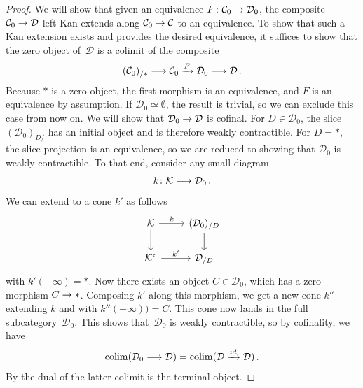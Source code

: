 \documentclass[10pt]{amsart}
\numberwithin{equation}{section}
\theoremstyle{definition}
\DeclareMathOperator*{\colim}{colim}
\newcommand{\cC}{\mathcal{C}}
\newcommand{\calD}{\mathcal{D}}
\newcommand{\cK}{\mathcal{K}}
\renewcommand{\to}{\mathchoice{\longrightarrow}{\rightarrow}{}{}}
\begin{document}
\begin{proof}
	We will show that given an equivalence $F\colon \cC_{0} \to \calD_{0}$, the composite $\cC_{0} \to \calD$ left Kan extends along $\cC_{0} \to \cC$ to an equivalence.
	To show that such a Kan extension exists and provides the desired equivalence,
	it suffices to show that the zero object of~$\calD$ is a colimit of the composite
	\begin{align*}
		(\cC_{0})_{/\ast} \to \cC_{0} \xrightarrow{F} \calD_{0} \to \calD \,.
	\end{align*}
	Because $\ast$ is a zero object, the first morphism is an equivalence, and $F$ is an equivalence by assumption.
	If $\calD_{0} \simeq \emptyset$, the result is trivial, so we can exclude this case from now on.
	We will show that $\calD_{0}\to \calD$ is cofinal. For $D\in \calD_{0}$, the slice $(\calD_{0})_{D/}$ has an initial object and is therefore weakly contractible.
	For $D=\ast$, the slice projection is an equivalence, so we are reduced to showing that $\calD_{0}$ is weakly contractible.
	To that end, consider any small diagram
	\begin{align*}
		k\colon \cK\to \calD_{0} \,.
	\end{align*}
	We can extend to a cone $k'$ as follows
	\begin{equation*}
		\begin{tikzcd}
			\cK \arrow[r, "k"] \arrow[d] & (\calD_{0})_{/D} \arrow[d] \\
			\cK^{\triangleleft} \arrow[r, "k'"] & \calD_{/D}
		\end{tikzcd}
	\end{equation*}
	with $k'(-\infty) = \ast$.
	Now there exists an object $C\in \calD_{0}$, which has a zero morphism $C\to \ast$.
	Composing $k'$ along this morphism, we get a new cone $k''$ extending $k$ and with $k''(-\infty) ) =C$.
	This cone now lands in the full subcategory~$\calD_{0}$.
  This shows that~$\calD_{0}$ is weakly contractible, so by cofinality, we have
	\begin{align*}
		\colim(\calD_{0}\to \calD ) = \colim(\calD \xrightarrow{id} \calD) \,.
	\end{align*}
	By the dual of \cite[Proposition 2.1.1]{nguyen2020adjoint} the latter colimit is the terminal object.
\end{proof}
\end{document}
